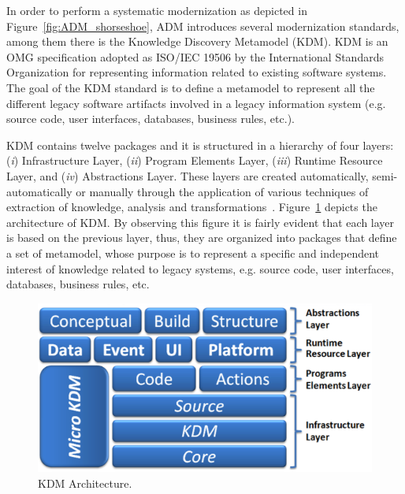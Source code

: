 In order to perform a systematic modernization as depicted in Figure~\ref{fig:ADM_shorseshoe}, ADM introduces several modernization standards, among them there is the Knowledge Discovery Metamodel (KDM).
KDM is an OMG specification adopted as ISO/IEC 19506 by the International Standards Organization for representing information related to existing software systems. 
The goal of the KDM standard is to define a metamodel to represent all the different legacy software artifacts involved in a legacy information system (e.g. source code, user interfaces, databases, business rules, etc.). %

KDM contains twelve packages and it is structured in a hierarchy of four layers: (\textit{i}) Infrastructure Layer, (\textit{ii}) Program Elements Layer, (\textit{iii}) Runtime Resource Layer, and (\textit{iv}) Abstractions Layer. These layers are created automatically, semi-automatically or manually through the application of various techniques of extraction of knowledge, analysis and transformations~\cite{1686216}. Figure~\ref{fig:kdmLayers} depicts the architecture of KDM. By observing this figure it is fairly evident that each layer is based on the previous layer, thus, they are organized into packages that define a set of metamodel, whose purpose is to represent a specific and independent interest of knowledge related to legacy systems, e.g. source code, user interfaces, databases, business rules, etc.

\begin{figure}[!ht]
\centering
 \includegraphics[scale=0.46]{figuras/kdm_layer}
\caption{KDM Architecture.}
\label{fig:kdmLayers}
\end{figure}

